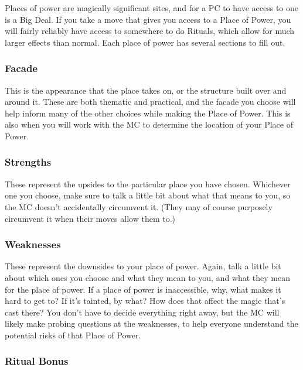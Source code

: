 \documentclass[
]{memoir}
\begin{document}
Places of power are magically significant sites, and for a PC to have
access to one is a Big Deal. If you take a move that gives you access to
a Place of Power, you will fairly reliably have access to somewhere to
do Rituals, which allow for much larger effects than normal. Each place
of power has several sections to fill out.

\hypertarget{facade}{%
\subsubsection{Facade}\label{facade}}

This is the appearance that the place takes on, or the structure built
over and around it. These are both thematic and practical, and the
facade you choose will help inform many of the other choices while
making the Place of Power. This is also when you will work with the MC
to determine the location of your Place of Power.

\hypertarget{strengths}{%
\subsubsection{Strengths}\label{strengths}}

These represent the upsides to the particular place you have chosen.
Whichever one you choose, make sure to talk a little bit about what that
means to you, so the MC doesn't accidentally circumvent it. (They may of
course purposely circumvent it when their moves allow them to.)

\hypertarget{weaknesses}{%
\subsubsection{Weaknesses}\label{weaknesses}}

These represent the downsides to your place of power. Again, talk a
little bit about which ones you choose and what they mean to you, and
what they mean for the place of power. If a place of power is
inaccessible, why, what makes it hard to get to? If it's tainted, by
what? How does that affect the magic that's cast there? You don't have
to decide everything right away, but the MC will likely make probing
questions at the weaknesses, to help everyone understand the potential
risks of that Place of Power.

\hypertarget{ritual-bonus}{%
\subsubsection{Ritual Bonus}\label{ritual-bonus}}
\end{document}
